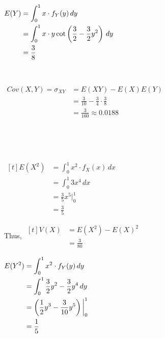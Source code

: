 \begin{example}[Count.]
\begin{enumerate}[label=\alph*)]
\begin{minipage}[t]{0.45\linewidth}
            $\begin{aligned}[t]
                E(Y) & = \int_0^1 x \cdot f_Y(y) \,dy                                        \\
                     & = \int_0^1 x \cdot y \cot \left(\frac{3}{2} - \frac{3}{2}y^2\right) \,dy \\
                     & = \frac{3}{8}
            \end{aligned}$
        \end{minipage}

        {~~~}

        $\begin{aligned}
            Cov(X, Y) = \sigma_{XY} & = E(XY) - E(X)E(Y)                             \\
                                    & = \frac{3}{10} - \frac{3}{4} \cdot \frac{3}{8} \\
                                    & = \frac{3}{160} \approx 0.0188
        \end{aligned}$

        {~~~}

        {~~~}

        \begin{minipage}[t]{0.45\linewidth}
            $\begin{aligned}[t]
                E(X^2) & = \int_0^1 x^2 \cdot f_X(x) \,dx \\
                       & = \int_0^1 3x^4 \,dx             \\
                       & = \frac{3}{5} x^5 \bigg|_0^1     \\
                       & = \frac{3}{5}
            \end{aligned}$

            Thus, $\begin{aligned}[t]
                V(X) & = E(X^2) - E(X)^2                       \\
                     & = \frac{3}{80}
            \end{aligned}$
        \end{minipage}
        \begin{minipage}[t]{0.45\linewidth}
            $\begin{aligned}[t]
                E(Y^2) & = \int_0^1 x^2 \cdot f_Y(y) \,dy                          \\
                       & = \int_0^1 \frac{3}{2} y^2 - \frac{3}{2}y^4 \,dy          \\
                       & = \left(\frac{1}{2} y^3 - \frac{3}{10} y^5\right) \bigg|_0^1 \\
                       & = \frac{1}{5}
            \end{aligned}$


\end{minipage}
\end{enumerate}
\end{example}
